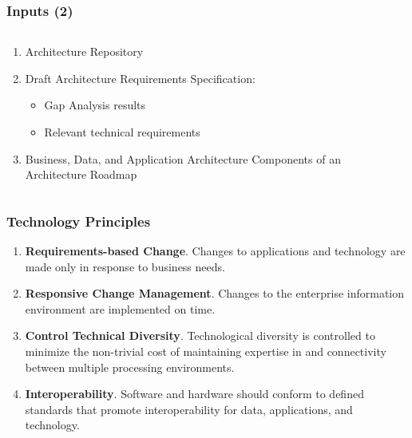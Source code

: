 \documentclass[aspectratio=169, table]{beamer}
\begin{document}
	\begin{frame}
		\frametitle{Inputs (2)}
		\begin{columns}[onlytextwidth]
			\begin{column}{0.5\textwidth}
				\begin{enumerate}
					\item Architecture Repository
					\item Draft Architecture Requirements Specification:
					\begin{itemize}
						\item Gap Analysis results
						\item Relevant technical requirements
					\end{itemize}
					\item Business, Data, and Application Architecture Components of an Architecture Roadmap
				\end{enumerate}
			\end{column}
			\begin{column}{0.5\textwidth}

			\end{column}
		\end{columns}
	\end{frame}

	\begin{frame}
		\frametitle{Technology Principles}
		\begin{enumerate}
			\item \textbf{Requirements-based Change}.
			Changes to applications and technology are made only in response to business needs.
			\item \textbf{Responsive Change Management}.
			Changes to the enterprise information environment are implemented on time.
			\item  \textbf{Control Technical Diversity}.
			Technological diversity is controlled to minimize the non-trivial cost of maintaining expertise in and connectivity between multiple processing environments.
			\item \textbf{Interoperability}. Software and hardware should conform to defined standards
			that promote interoperability for data, applications, and technology.
		\end{enumerate}
	\end{frame}
\end{document}
